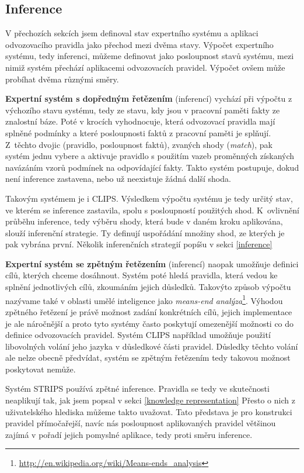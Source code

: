 \subsection{Inference}

V přechozích sekcích jsem definoval stav expertního systému a aplikaci
odvozovacího pravidla jako přechod mezi dvěma stavy. Výpočet expertního systému,
tedy inferenci, můžeme definovat jako posloupnost stavů systému, mezi nimiž
systém přechází aplikacemi odvozovacích pravidel. Výpočet ovšem může probíhat
dvěma různými směry.

\textbf{Expertní systém s dopředným řetězením} (inferencí) vychází při výpočtu z
výchozího stavu systému, tedy ze stavu, kdy jsou v pracovní paměti fakty ze
znalostní báze. Poté v krocích vyhodnocuje, která odvozovací pravidla mají
splněné podmínky a které posloupnosti faktů z pracovní paměti je splňují.
Z~těchto dvojic (pravidlo, posloupnost faktů), zvaných shody (\emph{match}), pak
systém jednu vybere a aktivuje pravidlo s použitím vazeb proměnných získaných
navázáním vzorů podmínek na odpovídající fakty. Takto systém postupuje, dokud není
inference zastavena, nebo už neexistuje žádná další shoda.

Takovým systémem je i CLIPS. Výsledkem výpočtu systému je tedy určitý stav, ve
kterém se inference zastavila, spolu s posloupností použitých shod. K~ovlivnění
průběhu inference, tedy výběru shody, která bude v daném kroku aplikována,
slouží inferenční strategie. Ty definují uspořádání množiny shod, ze kterých je
pak vybrána první. Několik inferenčních strategií popíšu v sekci \ref{inference}

\textbf{Expertní systém se zpětným řetězením} (inferencí) naopak umožňuje
definici cílů, kterých chceme dosáhnout. Systém poté hledá pravidla, která
vedou ke splnění jednotlivých cílů, zkoumáním jejich důsledků. Takovýto způsob
výpočtu nazývame také v oblasti umělé inteligence jako \emph{means-end
analýza}\footnote{\url{http://en.wikipedia.org/wiki/Means-ends\_analysis}}.
Výhodou zpětného řetězení je právě možnost zadání konkrétních cílů, jejich
implementace je ale náročnější a proto tyto systémy často poskytují omezenější
možnosti co do definice odvozovacích pravidel. Systém CLIPS například umožňuje
použití libovolných volání jeho jazyka v důsledkové části pravidel. Důsledky
těchto volání ale nelze obecně předvídat, systém se zpětným řetězením tedy
takovou možnost poskytovat nemůže.

Systém STRIPS používá zpětné inference. Pravidla se tedy ve skutečnosti
neaplikují tak, jak jsem popsal v sekci \ref{knowledge representation} Přesto o
nich z uživatelského hlediska můžeme takto uvažovat. Tato představa je pro
konstrukci pravidel přímočařejší, navíc nás posloupnost aplikovaných pravidel
většinou zajímá v pořadí jejich pomyslné aplikace, tedy proti směru inference.

